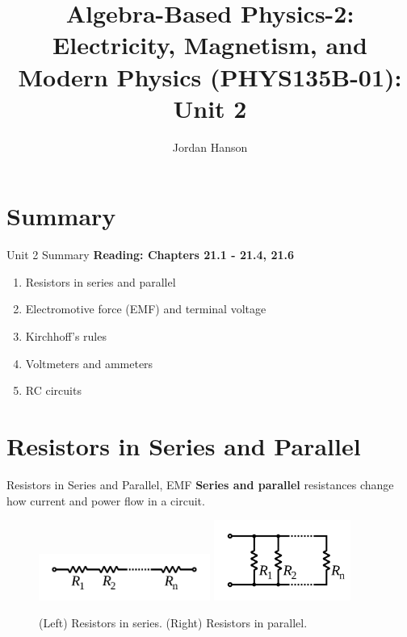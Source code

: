 \documentclass{beamer}
\title{Algebra-Based Physics-2: Electricity, Magnetism, and Modern Physics (PHYS135B-01): Unit 2}
\author{Jordan Hanson}
\institute{Whittier College Department of Physics and Astronomy}
\begin{document}
\maketitle

\section{Summary}

\begin{frame}{Unit 2 Summary}
\textbf{Reading: Chapters 21.1 - 21.4, 21.6}
\begin{enumerate}
\item Resistors in series and parallel
\item Electromotive force (EMF) and terminal voltage
\item Kirchhoff's rules
\item Voltmeters and ammeters
\item RC circuits
\end{enumerate}
\end{frame}

\section{Resistors in Series and Parallel}

\begin{frame}{Resistors in Series and Parallel, EMF}
\textbf{\alert{Series and parallel}} resistances change how current and power flow in a circuit.
\begin{figure}
\centering
\includegraphics[width=0.5\textwidth]{figures/series_resist.png}
\includegraphics[width=0.4\textwidth]{figures/parallel_resist.png}
\caption{\label{fig:series_and_parallel} (Left) Resistors in series. (Right) Resistors in parallel.}
\end{figure}
\end{frame}
\end{document}
